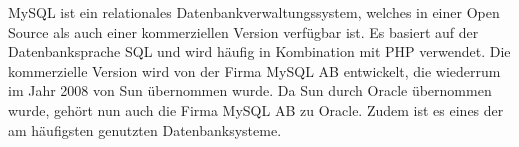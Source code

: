 MySQL ist ein relationales Datenbankverwaltungssystem, welches in einer Open Source als auch einer kommerziellen Version verfügbar ist. Es basiert auf der Datenbanksprache \ac{SQL} und wird häufig in Kombination mit \ac{PHP} verwendet. Die kommerzielle Version wird von der Firma MySQL AB entwickelt, die wiederrum im Jahr 2008 von Sun übernommen wurde. Da Sun durch Oracle übernommen wurde, gehört nun auch die Firma MySQL AB zu Oracle.  Zudem ist es eines der am häufigsten genutzten Datenbanksysteme.